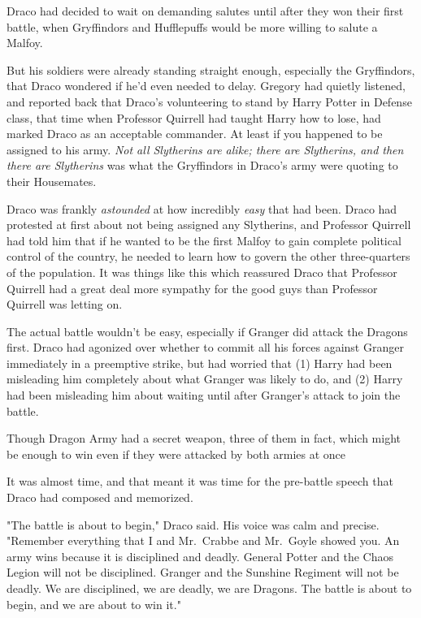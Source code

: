 Draco had decided to wait on demanding salutes until after they won their first
battle, when Gryffindors and Hufflepuffs would be more willing to salute a
Malfoy.

But his soldiers were already standing straight enough, especially the
Gryffindors, that Draco wondered if he'd even needed to delay. Gregory had
quietly listened, and reported back that Draco's volunteering to stand by Harry
Potter in Defense class, that time when Professor Quirrell had taught Harry how
to lose, had marked Draco as an acceptable commander. At least if you happened
to be assigned to his army. \emph{Not all Slytherins are alike; there are
Slytherins, and then there are Slytherins} was what the Gryffindors in Draco's
army were quoting to their Housemates.

Draco was frankly \emph{astounded} at how incredibly \emph{easy} that had been.
Draco had protested at first about not being assigned any Slytherins, and
Professor Quirrell had told him that if he wanted to be the first Malfoy to
gain complete political control of the country, he needed to learn how to
govern the other three-quarters of the population. It was things like this
which reassured Draco that Professor Quirrell had a great deal more sympathy
for the good guys than Professor Quirrell was letting on.

The actual battle wouldn't be easy, especially if Granger did attack the
Dragons first. Draco had agonized over whether to commit all his forces against
Granger immediately in a preemptive strike, but had worried that (1) Harry had
been misleading him completely about what Granger was likely to do, and (2)
Harry had been misleading him about waiting until after Granger's attack to
join the battle.

Though Dragon Army had a secret weapon, three of them in fact, which might be
enough to win even if they were attacked by both armies at once{\el}

It was almost time, and that meant it was time for the pre-battle speech that
Draco had composed and memorized.

"The battle is about to begin," Draco said. His voice was calm and precise.
"Remember everything that I and Mr.~Crabbe and Mr.~Goyle showed you. An army
wins because it is disciplined and deadly. General Potter and the Chaos Legion
will not be disciplined. Granger and the Sunshine Regiment will not be deadly.
We are disciplined, we are deadly, we are Dragons. The battle is about to
begin, and we are about to win it."
\sbreak
